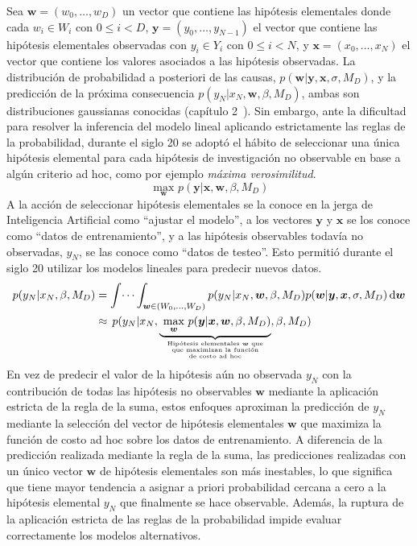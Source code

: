 \documentclass[a4paper,11pt]{book}
\newcommand\hfrac[2]{\genfrac{}{}{0pt}{}{#1}{#2}} %
\theoremstyle{definition}
\begin{document}
Sea $\bm{w} = (w_0, \dots, w_D)$ un vector que contiene las hip\'otesis elementales donde cada $w_i \in W_i$ con $0\leq i<D$, $\bm{y} = (y_0, \dots, y_{N-1})$ el vector que contiene las hip\'otesis elementales observadas con $y_i \in Y_i$ con $0\leq i<N$, y $\bm{x} = (x_0, \dots, x_N)$ el vector que contiene los valores asociados a las hip\'otesis observadas.
%
La distribuci\'on de probabilidad a posteriori de las causas, $p(\bm{w}|\bm{y}, \bm{x}, \sigma, M_D)$, y la predicci\'on de la pr\'oxima consecuencia $p(y_{N}|x_{N}, \bm{w}, \beta, M_D)$, ambas son distribuciones gaussianas conocidas (cap\'itulo 2~\cite{Bishop2006}).
%
Sin embargo, ante la dificultad para resolver la inferencia del modelo lineal aplicando estrictamente las reglas de la probabilidad, durante el siglo 20 se adopt\'o el h\'abito de seleccionar una \'unica hip\'otesis elemental para cada hip\'otesis de investigaci\'on no observable en base a alg\'un criterio ad hoc, como por ejemplo \emph{m\'axima verosimilitud}.
%
\begin{equation*}
 \underset{\bm{w}}{\text{ max }} p(\bm{y} | \bm{x}, \bm{w}, \beta, M_D)
\end{equation*}
%
A la acci\'on de seleccionar hip\'otesis elementales se la conoce en la jerga de Inteligencia Artificial como ``ajustar el modelo'', a los vectores $\bm{y}$ y $\bm{x}$ se los conoce como ``datos de entrenamiento'', y a las hip\'otesis observables todav\'ia no observadas, $y_N$, se las conoce como ``datos de testeo''.
%
Esto permiti\'o durante el siglo 20 utilizar los modelos lineales para predecir nuevos datos.
%
\begin{equation} \label{eq:prediccion_ad_hoc}
\begin{split}
p(y_N|x_N, \beta, M_D)
 & = \int\dots\int_{\bm{w} \in (W_0, \dots, W_D)} p(y_{N}|x_{N}, \bm{w}, \beta, M_D) p(\bm{w}|\bm{y}, \bm{x},\sigma, M_D) \, \text{d}\bm{w} \\
 &\approx \,  p(y_N|x_{N}, \underbrace{\underset{\bm{w}}{\text{ max }} p(\bm{y} | \bm{x}, \bm{w}, \beta, M_D)}_{\hfrac{\text{Hip\'otesis elementales $\bm{w}$ que}}{\hfrac{\text{que maximizan la funci\'on}}{\text{de costo ad hoc}} } } , \beta, M_D)
\end{split}
\end{equation}
%
En vez de predecir el valor de la hip\'otesis a\'un no observada $y_N$ con la contribuci\'on de todas las hip\'otesis no observables $\bm{w}$ mediante la aplicaci\'on estricta de la regla de la suma, estos enfoques aproximan la predicci\'on de $y_N$ mediante la selecci\'on del vector de hip\'otesis elementales $\bm{w}$ que maximiza la funci\'on de costo ad hoc sobre los datos de entrenamiento.
%
A diferencia de la predicci\'on realizada mediante la regla de la suma, las predicciones realizadas con un \'unico vector $\bm{w}$ de hip\'otesis elementales son m\'as inestables, lo que significa que tiene mayor tendencia a asignar a priori probabilidad cercana a cero a la hip\'otesis elemental $y_N$ que finalmente se hace observable.
%
Adem\'as, la ruptura de la aplicaci\'on estricta de las reglas de la probabilidad impide evaluar correctamente los modelos alternativos.
\end{document}
